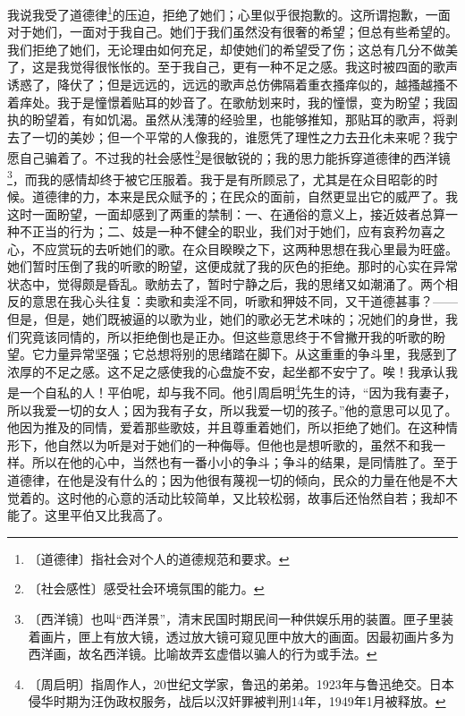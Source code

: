 \documentclass[12pt,UTF-8,openany]{ctexbook}
\begin{document}
\begin{normalsize}
    我说我受了道德律\footnote{〔道德律〕指社会对个人的道德规范和要求。}的压迫，拒绝了她们；心里似乎很抱歉的。这所谓抱歉，一面对于她们，一面对于我自己。她们于我们虽然没有很奢的希望；但总有些希望的。我们拒绝了她们，无论理由如何充足，却使她们的希望受了伤；这总有几分不做美了，这是我觉得很怅怅的。至于我自己，更有一种不足之感。我这时被四面的歌声诱惑了，降伏了；但是远远的，远远的歌声总仿佛隔着重衣搔痒似的，越搔越搔不着痒处。我于是憧憬着贴耳的妙音了。在歌舫划来时，我的憧憬，变为盼望；我固执的盼望着，有如饥渴。虽然从浅薄的经验里，也能够推知，那贴耳的歌声，将剥去了一切的美妙；但一个平常的人像我的，谁愿凭了理性之力去丑化未来呢？我宁愿自己骗着了。不过我的社会感性\footnote{〔社会感性〕感受社会环境氛围的能力。}是很敏锐的；我的思力能拆穿道德律的西洋镜\footnote{〔西洋镜〕也叫“西洋景”，清末民国时期民间一种供娱乐用的装置。匣子里装着画片，匣上有放大镜，透过放大镜可窥见匣中放大的画面。因最初画片多为西洋画，故名西洋镜。比喻故弄玄虚借以骗人的行为或手法。}，而我的感情却终于被它压服着。我于是有所顾忌了，尤其是在众目昭彰的时候。道德律的力，本来是民众赋予的；在民众的面前，自然更显出它的威严了。我这时一面盼望，一面却感到了两重的禁制：一、在通俗的意义上，接近妓者总算一种不正当的行为；二、妓是一种不健全的职业，我们对于她们，应有哀矜勿喜之心，不应赏玩的去听她们的歌。在众目睽睽之下，这两种思想在我心里最为旺盛。她们暂时压倒了我的听歌的盼望，这便成就了我的灰色的拒绝。那时的心实在异常状态中，觉得颇是昏乱。歌舫去了，暂时宁静之后，我的思绪又如潮涌了。两个相反的意思在我心头往复：卖歌和卖淫不同，听歌和狎妓不同，又干道德甚事？——但是，但是，她们既被逼的以歌为业，她们的歌必无艺术味的；况她们的身世，我们究竟该同情的，所以拒绝倒也是正办。但这些意思终于不曾撇开我的听歌的盼望。它力量异常坚强；它总想将别的思绪踏在脚下。从这重重的争斗里，我感到了浓厚的不足之感。这不足之感使我的心盘旋不安，起坐都不安宁了。唉！我承认我是一个自私的人！平伯呢，却与我不同。他引周启明\footnote{〔周启明〕指周作人，20世纪文学家，鲁迅的弟弟。1923年与鲁迅绝交。日本侵华时期为汪伪政权服务，战后以汉奸罪被判刑14年，1949年1月被释放。}先生的诗，“因为我有妻子，所以我爱一切的女人；因为我有子女，所以我爱一切的孩子。”他的意思可以见了。他因为推及的同情，爱着那些歌妓，并且尊重着她们，所以拒绝了她们。在这种情形下，他自然以为听是对于她们的一种侮辱。但他也是想听歌的，虽然不和我一样。所以在他的心中，当然也有一番小小的争斗；争斗的结果，是同情胜了。至于道德律，在他是没有什么的；因为他很有蔑视一切的倾向，民众的力量在他是不大觉着的。这时他的心意的活动比较简单，又比较松弱，故事后还怡然自若；我却不能了。这里平伯又比我高了。
    

\end{normalsize}
\end{document}
